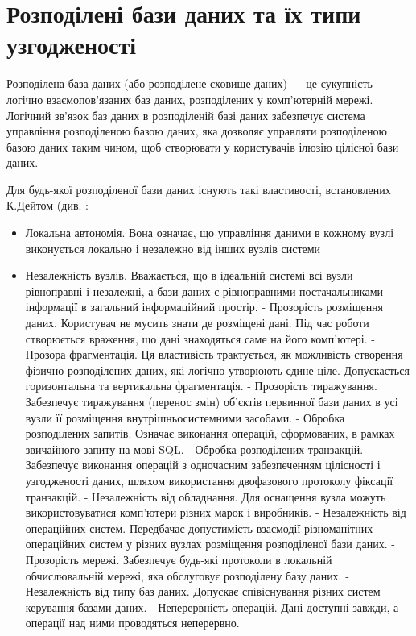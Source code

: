 \documentclass[14pt]{vakthesis}
\begin{document}
 \section{Розподілені бази даних та їх типи узгодженості}

Розподілена база даних (або розподілене сховище даних) — це сукупність логічно взаємопов'язаних баз даних, розподілених у комп'ютерній мережі. Логічний зв'язок баз даних в розподіленій базі даних забезпечує система управління розподіленою базою даних, яка дозволяє управляти розподіленою базою даних таким чином, щоб створювати у користувачів ілюзію цілісної бази даних. 


Для будь-якої розподіленої бази даних існують такі властивості, встановлених К.Дейтом (див. \cite{bib:database_principles} :
\begin{itemize}
 \item Локальна автономія. Вона означає, що управління даними в кожному вузлі виконується локально і незалежно від інших вузлів системи
 \item Незалежність вузлів. Вважається, що в ідеальній системі всі вузли рівноправні і незалежні, а бази даних є рівноправними постачальниками інформації в загальний інформаційний простір.
 - Прозорість розміщення даних. Користувач не мусить знати де розміщені дані. Під час роботи створюється враження, що дані знаходяться саме на його комп’ютері.
 - Прозора фрагментація. Ця властивість трактується, як можливість створення фізично розподілених даних, які логічно утворюють єдине ціле. Допускається горизонтальна та вертикальна фрагментація.
 - Прозорість тиражування. Забезпечує тиражування (перенос змін) об’єктів первинної бази даних в усі вузли її розміщення внутрішньосистемними засобами.
 - Обробка розподілених запитів. Означає виконання операцій, сформованих, в рамках звичайного запиту на мові SQL.
 - Обробка розподілених транзакцій. Забезпечує виконання операцій з одночасним забезпеченням цілісності і узгодженості даних, шляхом використання двофазового протоколу фіксації транзакцій.
 - Незалежність від обладнання. Для оснащення вузла можуть використовуватися комп’ютери різних марок і виробників.
 - Незалежність від операційних систем. Передбачає допустимість взаємодії різноманітних операційних систем у різних вузлах розміщення розподіленої бази даних.
 - Прозорість мережі. Забезпечує будь-які протоколи в локальній обчислювальній мережі, яка обслуговує розподілену базу даних.
 - Незалежність від типу баз даних. Допускає співіснування різних систем керування базами даних.
 - Неперервність операцій. Дані доступні завжди, а операції над ними проводяться неперервно.

\end{itemize} 
\end{document}
